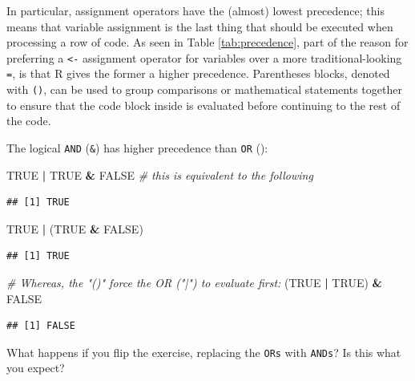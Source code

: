 \documentclass[
]{book}
\newenvironment{Shaded}{\begin{snugshade}}{\end{snugshade}}
\newcommand{\CommentTok}[1]{\textcolor[rgb]{0.56,0.35,0.01}{\textit{#1}}}
\newcommand{\ConstantTok}[1]{\textcolor[rgb]{0.56,0.35,0.01}{#1}}
\newcommand{\NormalTok}[1]{#1}
\newcommand{\SpecialCharTok}[1]{\textcolor[rgb]{0.81,0.36,0.00}{\textbf{#1}}}
\begin{document}
In particular, assignment operators have the (almost) lowest precedence; this means that variable assignment is the last thing that should be executed when processing a row of code. As seen in Table \ref{tab:precedence}, part of the reason for preferring a \texttt{\textless{}-} assignment operator for variables over a more traditional-looking \texttt{=}, is that R gives the former a higher precedence. Parentheses blocks, denoted with \texttt{()}, can be used to group comparisons or mathematical statements together to ensure that the code block inside is evaluated before continuing to the rest of the code.

The logical \texttt{AND} (\texttt{\&}) has higher precedence than \texttt{OR} (\texttt{\textbar{}}):

\begin{Shaded}
\begin{Highlighting}[]
\ConstantTok{TRUE} \SpecialCharTok{|} \ConstantTok{TRUE} \SpecialCharTok{\&} \ConstantTok{FALSE} \CommentTok{\# this is equivalent to the following}
\end{Highlighting}
\end{Shaded}

\begin{verbatim}
## [1] TRUE
\end{verbatim}

\begin{Shaded}
\begin{Highlighting}[]
\ConstantTok{TRUE} \SpecialCharTok{|}\NormalTok{ (}\ConstantTok{TRUE} \SpecialCharTok{\&} \ConstantTok{FALSE}\NormalTok{)}
\end{Highlighting}
\end{Shaded}

\begin{verbatim}
## [1] TRUE
\end{verbatim}

\begin{Shaded}
\begin{Highlighting}[]
\CommentTok{\# Whereas, the "()" force the OR ("|") to evaluate first:}
\NormalTok{(}\ConstantTok{TRUE} \SpecialCharTok{|} \ConstantTok{TRUE}\NormalTok{) }\SpecialCharTok{\&} \ConstantTok{FALSE} 
\end{Highlighting}
\end{Shaded}

\begin{verbatim}
## [1] FALSE
\end{verbatim}

What happens if you flip the exercise, replacing the \texttt{ORs} with \texttt{ANDs}? Is this what you expect?
\end{document}

